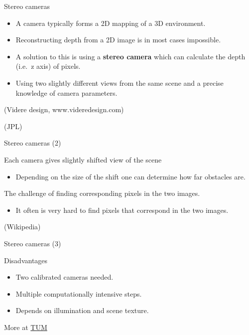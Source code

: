 \documentclass[compress]{beamer}
\providecommand{\tightlist}{%
  \setlength{\itemsep}{0pt}\setlength{\parskip}{0pt}}
\begin{document}
\begin{frame}{Stereo cameras}

\begin{itemize}
\tightlist
\item
  A camera typically forms a 2D mapping of a 3D environment.
\item
  Reconstructing depth from a 2D image is in most cases impossible.
\item
  A solution to this is using a \textbf{stereo camera} which can
  calculate the depth (i.e.~z axis) of pixels.
\item
  Using two slightly different views from the same scene and a precise
  knowledge of camera parameters.
\end{itemize}

(Videre design, www.videredesign.com)

(JPL)

\end{frame}

\begin{frame}{Stereo cameras (2)}

Each camera gives slightly shifted view of the scene

\begin{itemize}
\tightlist
\item
  Depending on the size of the shift one can determine how far obstacles
  are.
\end{itemize}

The challenge of finding corresponding pixels in the two images.

\begin{itemize}
\tightlist
\item
  It often is very hard to find pixels that correspond in the two
  images.
\end{itemize}

(Wikipedia)

\end{frame}

\begin{frame}{Stereo cameras (3)}

Disadvantages

\begin{itemize}
\tightlist
\item
  Two calibrated cameras needed.
\item
  Multiple computationally intensive steps.
\item
  Depends on illumination and scene texture.
\end{itemize}

More at
\href{http://campar.in.tum.de/twiki/pub/Chair/TeachingSs11Kinect/2011-DSensors_LabCourse_Kinect.pdf}{TUM}

\end{frame}
\end{document}
